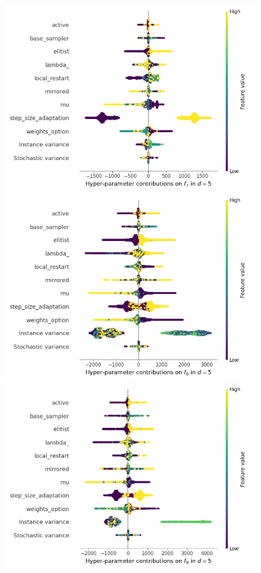 \begin{figure}[t]
	\includegraphics[height=0.15\textheight,trim=60mm 0mm 30mm 0mm,clip]{cma_img_new/img_summary_f7_d5.png}
	\includegraphics[height=0.15\textheight,trim=60mm 0mm 0mm 0mm,clip]{cma_img_new/img_summary_f8_d5.png}
	\includegraphics[height=0.15\textheight,trim=0mm 0mm 30mm 0mm,clip]{cma_img_new/img_summary_f9_d5.png}

\end{figure}
